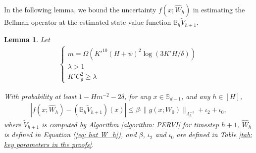 \documentclass{article} \usepackage{iclr2023/iclr2023_conference,times}
\newtheorem{lemma}{Lemma}[section]
\begin{document}
In the following lemma, we bound the uncertainty $f(x; \hat{W}_h)$ in estimating the Bellman operator at the estimated state-value function $\mathbb{B}_h \tilde{V}_{h+1}$. 
\begin{lemma}
Let 
\begin{align*}
\begin{cases}
    m = \Omega \left( K'^{10} (H + \psi)^2 \log(3 K'H/\delta)\right) \\ 
    \lambda > 1 \\ 
    K' C_g^2 \geq \lambda 
\end{cases}
\end{align*}



 With probability at least $ 1 - H m^{-2} - 2 \delta$, for any $x \in \mathbb{S}_{d-1}$, and any $h \in [H]$,
 \begin{align*}
    |f(x; \hat{W}_h) - (\mathbb{B}_h \tilde{V}_{h+1})(x)| 
    \leq \beta  \cdot \| g(x; W_0) \|_{\Lambda_h^{-1}} + \iota_2 + \iota_0, 
\end{align*}
where $\tilde{V}_{h+1}$ is computed by Algorithm \ref{algorithm: PERVI} for timestep $h+1$, $\hat{W}_h$ is defined in Equation (\ref{eq: hat W_h}), and
$\beta$, $\iota_2$ and $\iota_0$ are defined in Table \ref{tab: key parameters in the proofs}. 
\label{lemma: bound ERM with the Bellman target}
\end{lemma}
\end{document}
